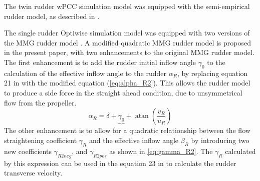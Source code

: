 The twin rudder wPCC simulation model was equipped with the semi-empirical rudder model, as described in \citet{alexanderssonSystemIdentificationPhysicsinformed2024b}.

The single rudder Optiwise simulation model was equipped with two versions of the MMG rudder model \citep{yasukawaIntroductionMMGStandard2015}.
A modified quadratic MMG rudder model is proposed in the present paper, with two enhancements to the original MMG rudder model. The first enhancement is to add the rudder initial inflow angle $\gamma_0$ to the calculation of the effective inflow angle to the rudder $\alpha_R$, by replacing equation 21 in \citet{yasukawaIntroductionMMGStandard2015} with the modified equation (\autoref{eq:alpha_R2}). This allows the rudder model to produce a side force in the straight ahead condition, due to unsymmetrical flow from the propeller. 
\begin{equation}
    \label{eq:alpha_R2}
    \alpha_{R} = \delta + \underbrace{\gamma_{0}}_{~} + \operatorname{atan}{\left(\frac{v_{R}}{u_{R}} \right)}
\end{equation}
The other enhancement is to allow for a quadratic relationship between the flow straightening coefficient $\gamma_R$ and the effective inflow angle $\beta_R$ by introducing two new coefficients $\gamma_{R2neg}$, and $\gamma_{R2pos}$ as shown in \autoref{eq:gamma_R2}. The $\gamma_R$ calculated by this expression can be used in the equation 23 in \citet{yasukawaIntroductionMMGStandard2015} to calculate the rudder transverse velocity.  
\begin{equation}
    \label{eq:gamma_R2}
    
\end{equation}

